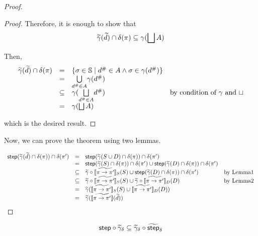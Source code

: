 \begin{proof}
\begin{proof}
Therefore, it is enough to show that
\[
  \widetilde{\gamma}(\widetilde{d}) \cap \delta(\pi) \subseteq
  \gamma(\bigsqcup A )
\]

Then,
\[
  \begin{array}{rclr}
    \widetilde{\gamma}(\widetilde{d}) \cap \delta(\pi)
    &=& \{
          \sigma \in \mathbb{S} \mid
          {d}^{\#} \in A \wedge
          \sigma \in \gamma({d}^{\#})
        \} \\
    &=& \underset{{d}^{\#} \in A}{\bigcup}{\gamma({d}^{\#})} \\
    &\subseteq& \gamma(\underset{{d}^{\#} \in A}{\bigsqcup}{{d}^{\#}})
      & \text{by condition of $\gamma$ and $\sqcup$} \\
    &=& \gamma (\bigsqcup A)
  \end{array}
\]

which is the desired result.
\end{proof}

Now, we can prove the theorem using two lemmas.

\[
  \begin{array}{rclr}
    \step(\combgamma(\combelem) \cap \viewmap(\view)) \cap \viewmap(\view')
    &=& \step(\combgamma(S \cup D) \cap \viewmap(\view)) \cap \viewmap(\view')\\
    &=& \step(\combgamma(S) \cap \viewmap(\view)) \cap \viewmap(\view') \cup
        \step(\combgamma(D) \cap \viewmap(\view)) \cap \viewmap(\view')\\
    &\subseteq& \combgamma \circ \combviewtrans{\view}{\view'}_S(S) \cup
        \step(\combgamma(D) \cap \viewmap(\view)) \cap \viewmap(\view') & \text{by Lemma1}\\
    &\subseteq& \combgamma \circ \combviewtrans{\view}{\view'}_S(S) \cup
        \combgamma \circ \combviewtrans{\view}{\view'}_D(D) & \text{by Lemma2}\\
    &=& \combgamma(\combviewtrans{\view}{\view'}_S(S) \cup \combviewtrans{\view}{\view'}_D(D))\\
    &=& \combgamma(\combviewtrans{\view}{\view'}(\combelem))
  \end{array}
\]

\end{proof}

\begin{theorem}
\[
  \textsf{step} \circ \widetilde{\gamma}_\delta \subseteq \widetilde{\gamma}_\delta \circ \widetilde{\textsf{step}}_\delta
\]
\end{theorem}

